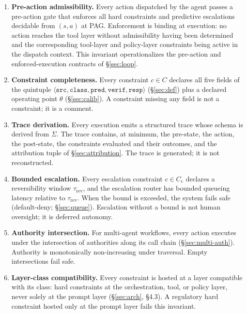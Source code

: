 \documentclass[11pt,a4paper]{article}
\theoremstyle{remark}
\begin{document}
\begin{enumerate}[label={\textbf{I\arabic*}.},leftmargin=2.6em,topsep=0.3em,itemsep=0.4em]
\item \textbf{Pre-action admissibility.} Every action dispatched by the agent passes a pre-action gate that enforces all hard constraints and predictive escalations decidable from $(s, a)$ at PAG. Enforcement is binding at execution: no action reaches the tool layer without admissibility having been determined and the corresponding tool-layer and policy-layer constraints being active in the dispatch context. This invariant operationalizes the pre-action and enforced-execution contracts of \S\ref{sec:loop}.

\item \textbf{Constraint completeness.} Every constraint $c \in C$ declares all five fields of the quintuple $\langle \texttt{src}, \texttt{class}, \texttt{pred}, \texttt{verif}, \texttt{resp} \rangle$ (\S\ref{sec:def}) plus a declared operating point $\theta$ (\S\ref{sec:calib}). A constraint missing any field is not a constraint; it is a comment.

\item \textbf{Trace derivation.} Every execution emits a structured trace whose schema is derived from $\Sigma$. The trace contains, at minimum, the pre-state, the action, the post-state, the constraints evaluated and their outcomes, and the attribution tuple of \S\ref{sec:attribution}. The trace is generated; it is not reconstructed.

\item \textbf{Bounded escalation.} Every escalation constraint $c \in C_e$ declares a reversibility window $\tau_{\text{rev}}$, and the escalation router has bounded queueing latency relative to $\tau_{\text{rev}}$. When the bound is exceeded, the system fails safe (default-deny; \S\ref{sec:queue}). Escalation without a bound is not human oversight; it is deferred autonomy.

\item \textbf{Authority intersection.} For multi-agent workflows, every action executes under the intersection of authorities along its call chain (\S\ref{sec:multi-auth}). Authority is monotonically non-increasing under traversal. Empty intersections fail safe.

\item \textbf{Layer-class compatibility.} Every constraint is hosted at a layer compatible with its class: hard constraints at the orchestration, tool, or policy layer, never solely at the prompt layer (\S\ref{sec:arch}, \S4.3). A regulatory hard constraint hosted only at the prompt layer fails this invariant.


\end{enumerate}
\end{document}
